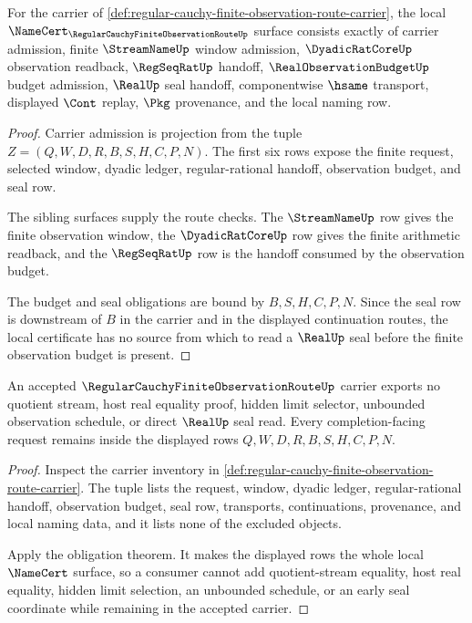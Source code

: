 \begin{theorem}
\label{thm:regular-cauchy-finite-observation-route-obligations}
For the carrier of \autoref{def:regular-cauchy-finite-observation-route-carrier}, the local $\NameCert_{\RegularCauchyFiniteObservationRouteUp}$ surface consists exactly of carrier admission, finite $\StreamNameUp$ window admission, $\DyadicRatCoreUp$ observation readback, $\RegSeqRatUp$ handoff, $\RealObservationBudgetUp$ budget admission, $\RealUp$ seal handoff, componentwise $\hsame$ transport, displayed $\Cont$ replay, $\Pkg$ provenance, and the local naming row.
\end{theorem}
\begin{proof}
Carrier admission is projection from the tuple $Z=(Q,W,D,R,B,S,H,C,P,N)$. The first six rows expose the finite request, selected window, dyadic ledger, regular-rational handoff, observation budget, and seal row.

The sibling surfaces supply the route checks. The $\StreamNameUp$ row gives the finite observation window, the $\DyadicRatCoreUp$ row gives the finite arithmetic readback, and the $\RegSeqRatUp$ row is the handoff consumed by the observation budget.

The budget and seal obligations are bound by $B,S,H,C,P,N$. Since the seal row is downstream of $B$ in the carrier and in the displayed continuation routes, the local certificate has no source from which to read a $\RealUp$ seal before the finite observation budget is present.
\end{proof}

\begin{theorem}
\label{thm:regular-cauchy-finite-observation-route-nonescape}
An accepted $\RegularCauchyFiniteObservationRouteUp$ carrier exports no quotient stream, host real equality proof, hidden limit selector, unbounded observation schedule, or direct $\RealUp$ seal read. Every completion-facing request remains inside the displayed rows $Q,W,D,R,B,S,H,C,P,N$.
\end{theorem}
\begin{proof}
Inspect the carrier inventory in \autoref{def:regular-cauchy-finite-observation-route-carrier}. The tuple lists the request, window, dyadic ledger, regular-rational handoff, observation budget, seal row, transports, continuations, provenance, and local naming data, and it lists none of the excluded objects.

Apply the obligation theorem. It makes the displayed rows the whole local $\NameCert$ surface, so a consumer cannot add quotient-stream equality, host real equality, hidden limit selection, an unbounded schedule, or an early seal coordinate while remaining in the accepted carrier.
\end{proof}

